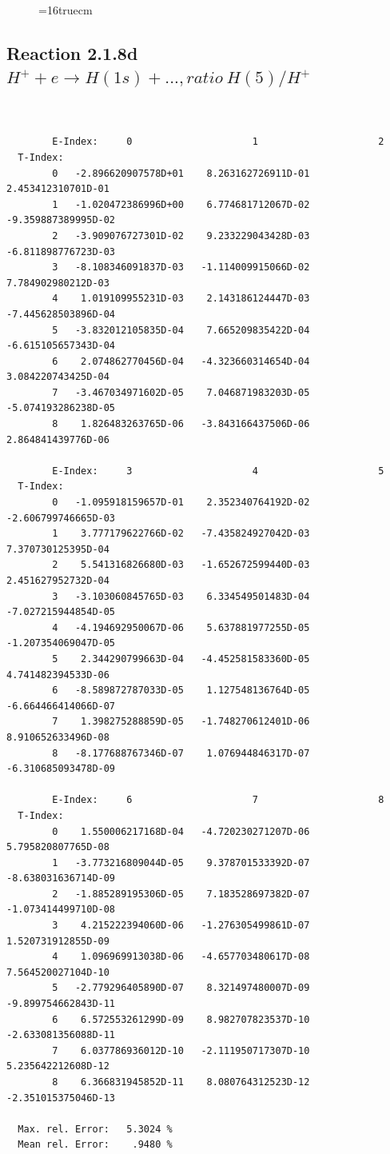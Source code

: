 \documentclass[12pt,dvips]{article}
\begin{document}
\begin{figure} \label{2.1.8rc}
\epsfxsize=16truecm
\end{figure}
\newpage



\subsection{
Reaction 2.1.8d  $H^+ + e \rightarrow H(1s) + ...,  ratio ~ H(5)/H^+$
}

\begin{small}\begin{verbatim}


        E-Index:     0                     1                     2
  T-Index:
        0   -2.896620907578D+01    8.263162726911D-01    2.453412310701D-01
        1   -1.020472386996D+00    6.774681712067D-02   -9.359887389995D-02
        2   -3.909076727301D-02    9.233229043428D-03   -6.811898776723D-03
        3   -8.108346091837D-03   -1.114009915066D-02    7.784902980212D-03
        4    1.019109955231D-03    2.143186124447D-03   -7.445628503896D-04
        5   -3.832012105835D-04    7.665209835422D-04   -6.615105657343D-04
        6    2.074862770456D-04   -4.323660314654D-04    3.084220743425D-04
        7   -3.467034971602D-05    7.046871983203D-05   -5.074193286238D-05
        8    1.826483263765D-06   -3.843166437506D-06    2.864841439776D-06

        E-Index:     3                     4                     5
  T-Index:
        0   -1.095918159657D-01    2.352340764192D-02   -2.606799746665D-03
        1    3.777179622766D-02   -7.435824927042D-03    7.370730125395D-04
        2    5.541316826680D-03   -1.652672599440D-03    2.451627952732D-04
        3   -3.103060845765D-03    6.334549501483D-04   -7.027215944854D-05
        4   -4.194692950067D-06    5.637881977255D-05   -1.207354069047D-05
        5    2.344290799663D-04   -4.452581583360D-05    4.741482394533D-06
        6   -8.589872787033D-05    1.127548136764D-05   -6.664466414066D-07
        7    1.398275288859D-05   -1.748270612401D-06    8.910652633496D-08
        8   -8.177688767346D-07    1.076944846317D-07   -6.310685093478D-09

        E-Index:     6                     7                     8
  T-Index:
        0    1.550006217168D-04   -4.720230271207D-06    5.795820807765D-08
        1   -3.773216809044D-05    9.378701533392D-07   -8.638031636714D-09
        2   -1.885289195306D-05    7.183528697382D-07   -1.073414499710D-08
        3    4.215222394060D-06   -1.276305499861D-07    1.520731912855D-09
        4    1.096969913038D-06   -4.657703480617D-08    7.564520027104D-10
        5   -2.779296405890D-07    8.321497480007D-09   -9.899754662843D-11
        6    6.572553261299D-09    8.982707823537D-10   -2.633081356088D-11
        7    6.037786936012D-10   -2.111950717307D-10    5.235642212608D-12
        8    6.366831945852D-11    8.080764312523D-12   -2.351015375046D-13

  Max. rel. Error:   5.3024 %
  Mean rel. Error:    .9480 %


\end{verbatim}\end{small}
\end{document}
